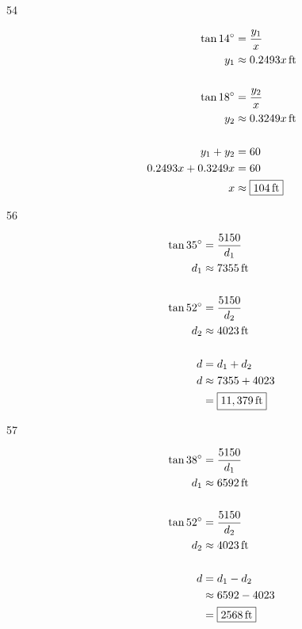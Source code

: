 \documentclass{exam}
\newcommand{\dg}{\ensuremath{^\circ}}
\begin{document}
\begin{description}
      \item[54]
        \begin{align*}
          \tan 14 \dg & = \frac{y_1}{x} \\
          y_1         & \approx \unit[0.2493 x]{ft} \\
          \\
          \tan 18 \dg & = \frac{y_2}{x} \\
          y_2         & \approx \unit[0.3249 x]{ft} \\
          \\
          y_1 + y_2           & = 60 \\
          0.2493 x + 0.3249 x & = 60 \\
          x                   & \approx \boxed{ \unit[104]{ft} } \\
        \end{align*}

      \item[56]
        \begin{align*}
          \tan 35 \dg & = \frac{5150}{d_1} \\
          d_1         & \approx \unit[7355]{ft} \\
          \\
          \tan 52 \dg & = \frac{5150}{d_2} \\
          d_2         & \approx \unit[4023]{ft} \\
          \\
          d           & = d_1 + d_2 \\
          d           & \approx 7355 + 4023 \\
                      & = \boxed{ \unit[11,379]{ft} } \\
        \end{align*}

      \item[57]
        \begin{align*}
          \tan 38 \dg & = \frac{5150}{d_1} \\
          d_1         & \approx \unit[6592]{ft} \\
          \\
          \tan 52 \dg & = \frac{5150}{d_2} \\
          d_2         & \approx \unit[4023]{ft} \\
          \\
          d           & = d_1 - d_2 \\
                      & \approx 6592 - 4023 \\
                      & = \boxed{ \unit[2568]{ft} } \\
        \end{align*}


\end{description}
\end{document}
